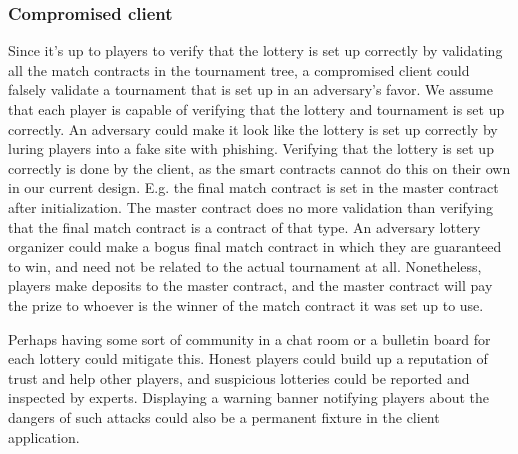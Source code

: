 \subsubsection{Compromised client}
Since it's up to players to verify that the lottery is set up correctly by validating all the match contracts in the tournament tree, a compromised client could falsely validate a tournament that is set up in an adversary's favor. We assume that each player is capable of verifying that the lottery and tournament is set up correctly. An adversary could make it look like the lottery is set up correctly by luring players into a fake site with phishing. Verifying that the lottery is set up correctly is done by the client, as the smart contracts cannot do this on their own in our current design. E.g. the final match contract is set in the master contract after initialization. The master contract does no more validation than verifying that the final match contract is a contract of that type. An adversary lottery organizer could make a bogus final match contract in which they are guaranteed to win, and need not be related to the actual tournament at all. Nonetheless, players make deposits to the master contract, and the master contract will pay the prize to whoever is the winner of the match contract it was set up to use.

Perhaps having some sort of community in a chat room or a bulletin board for each lottery could mitigate this. Honest players could build up a reputation of trust and help other players, and suspicious lotteries could be reported and inspected by experts. Displaying a warning banner notifying players about the dangers of such attacks could also be a permanent fixture in the client application.
